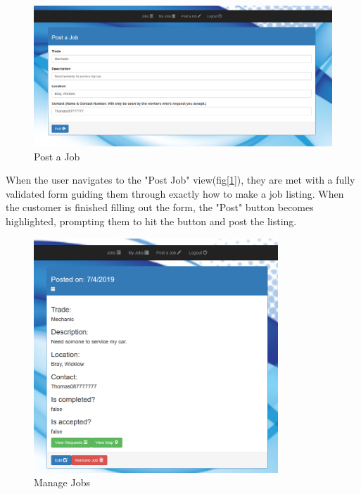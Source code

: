 \begin{figure}[H]
    \centering
    \includegraphics[width=\textwidth, height=150pt]{img/Customer2.PNG}
    \caption{Post a Job}
    \label{fig:postView}
\end{figure}

\bigskip

When the user navigates to the "Post Job" view(fig[\ref{fig:postView}]), they are met with a fully validated form guiding them through exactly how to make a job listing. When the customer is finished filling out the form, the "Post" button becomes highlighted, prompting them to hit the button and post the listing.

\begin{figure}[H]
    \centering
    \includegraphics[width=\textwidth, height=250pt]{img/Customer3.PNG}
    \caption{Manage Jobs}
    \label{fig:manageJobs}
\end{figure}

\bigskip

